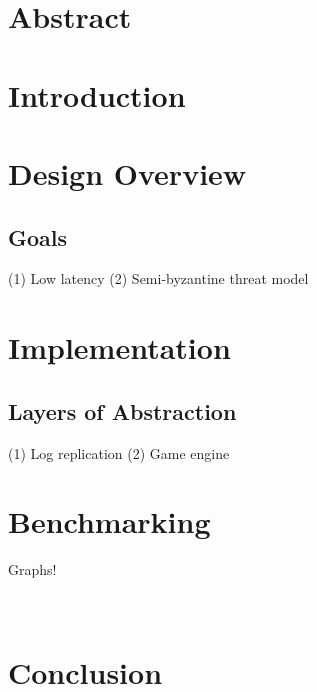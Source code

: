 \documentclass[11pt]{article}
\begin{document}
\section{Abstract}

\section{Introduction}

\section{Design Overview}

\subsection{Goals}

(1) Low latency
(2) Semi-byzantine threat model

\section{Implementation}

\subsection{Layers of Abstraction}

(1) Log replication
(2) Game engine

\section{Benchmarking}

Graphs!

~\cite{Nobody06}

\section{Conclusion}

{}

\end{document}
